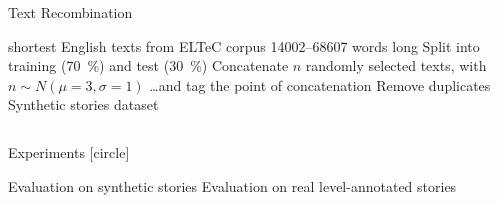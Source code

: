 \documentclass[aspectratio=169]{beamer}
\begin{document}
\begin{frame}{Text Recombination}
\begin{outline}
 shortest English texts from ELTeC corpus 
\2 \numrange{14002}{68607} words long
\1 Split into training (\SI{70}{\percent}) and test (\SI{30}{\percent})
\1 Concatenate $n$ randomly selected texts, with $n\sim N(\mu=3, \sigma=1)$
\2 \dots and tag the point of concatenation
\1 Remove duplicates
\1[=] Synthetic stories dataset
\end{outline}
\pause
{}
\pause
\begin{columns}
\begin{column}{0.47\paperwidth}
\begin{block}{Experiments}
[circle]
\renewcommand\outlinei{enumerate}
\begin{outline}
\1 Evaluation on synthetic stories
\1 Evaluation on real level-annotated stories
\end{outline}
\end{block}  
\end{column}
\begin{column}{0.4\paperwidth}
  
\end{column}
\end{columns}
\end{frame}
\end{document}
